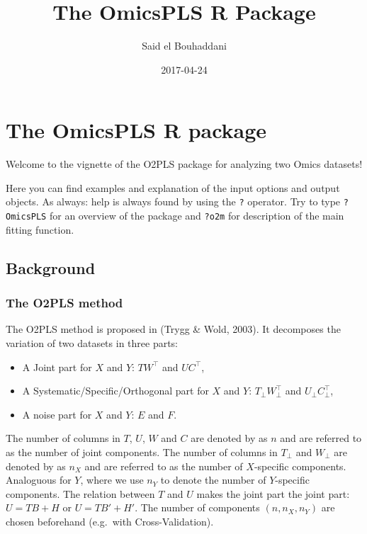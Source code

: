 \documentclass[]{article}
\title{The OmicsPLS R Package}
\author{Said el Bouhaddani}
\date{2017-04-24}
\providecommand{\tightlist}{%
  \setlength{\itemsep}{0pt}\setlength{\parskip}{0pt}}
\begin{document}
\maketitle

\section{The OmicsPLS R package}\label{the-omicspls-r-package}

Welcome to the vignette of the O2PLS package for analyzing two Omics
datasets!

Here you can find examples and explanation of the input options and
output objects. As always: help is always found by using the \texttt{?}
operator. Try to type \texttt{?OmicsPLS} for an overview of the package
and \texttt{?o2m} for description of the main fitting function.

\subsection{Background}\label{background}

\subsubsection{The O2PLS method}\label{the-o2pls-method}

The O2PLS method is proposed in (Trygg \& Wold, 2003). It decomposes the
variation of two datasets in three parts:

\begin{itemize}
\tightlist
\item
  A Joint part for \(X\) and \(Y\): \(TW^\top\) and \(UC^\top\),
\item
  A Systematic/Specific/Orthogonal part for \(X\) and \(Y\):
  \(T_\perp W_\perp^\top\) and \(U_\perp C_\perp^\top\),
\item
  A noise part for \(X\) and \(Y\): \(E\) and \(F\).
\end{itemize}

The number of columns in \(T\), \(U\), \(W\) and \(C\) are denoted by as
\(n\) and are referred to as the number of joint components. The number
of columns in \(T_\perp\) and \(W_\perp\) are denoted by as \(n_X\) and
are referred to as the number of \(X\)-specific components. Analoguous
for \(Y\), where we use \(n_Y\) to denote the number of \(Y\)-specific
components. The relation between \(T\) and \(U\) makes the joint part
the joint part: \(U = TB + H\) or \(U = TB'+ H'\). The number of
components \((n, n_X, n_Y)\) are chosen beforehand (e.g.~with
Cross-Validation).
\end{document}
